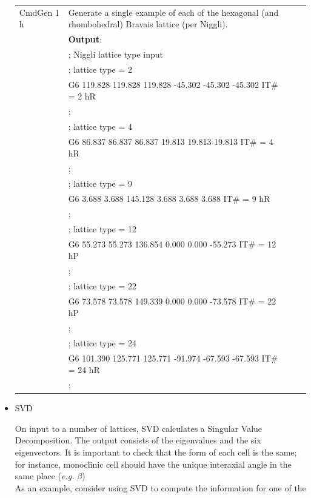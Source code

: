 \documentclass[preprint]{iucr}              %
\numberwithin{equation}{section}
\begin{document}
\begin{itemize}
\begin{table}
\begin{tabular}{l l l l}
			CmdGen 1 h& Generate a single example of each of the hexagonal (and rhombohedral) Bravais lattice (per Niggli).\\
			{}&\textbf{Output}:\\
			{}&; Niggli lattice type input\\
			{}&; lattice type = 2\\
			{}&G6   119.828   119.828   119.828   -45.302   -45.302   -45.302   IT\# = 2  hR\\
			{}&;\\
			{}&; lattice type = 4\\
			{}&G6    86.837    86.837    86.837    19.813    19.813    19.813   IT\# = 4  hR\\
			{}&;\\
			{}&; lattice type = 9\\
			{}&G6     3.688     3.688   145.128     3.688     3.688     3.688   IT\# = 9  hR\\
			{}&;\\
			{}&; lattice type = 12\\
			{}&G6    55.273    55.273   136.854     0.000     0.000   -55.273   IT\# = 12  hP\\
			{}&;\\
			{}&; lattice type = 22\\
			{}&G6    73.578    73.578   149.339     0.000     0.000   -73.578   IT\# = 22  hP\\
			{}&;\\
			{}&; lattice type = 24\\
			{}&G6   101.390   125.771   125.771   -91.974   -67.593   -67.593   IT\# = 24  hR\\
			{}&;\\
			\bottomrule
		\end{tabular}	
	\end{table}	
	
	
	\item SVD
	
	On input to a number of lattices, 
	SVD calculates a Singular Value Decomposition.
	The output consists of the eigenvalues and 
	the six eigenvectors.
	It is important to check that the form of
	each cell is the same; for instance, monoclinic
	cell should have the unique interaxial angle
	in the same place (\textit{e.g.} $\beta$)\\
	
	As an example, consider using SVD to compute the information
	for one of the 
	

\end{itemize}
\end{document}
